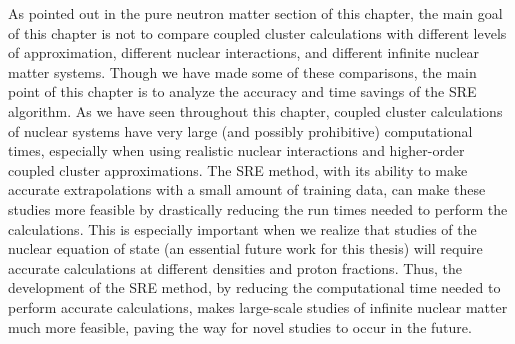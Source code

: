 As pointed out in the pure neutron matter section of this chapter, the main goal of this chapter is not to compare coupled cluster calculations with different levels of approximation, different nuclear interactions, and different infinite nuclear matter systems. Though we have made some of these comparisons, the main point of this chapter is to analyze the accuracy and time savings of the SRE algorithm. As we have seen throughout this chapter, coupled cluster calculations of nuclear systems have very large (and possibly prohibitive) computational times, especially when using realistic nuclear interactions and higher-order coupled cluster approximations. The SRE method, with its ability to make accurate extrapolations with a small amount of training data, can make these studies more feasible by drastically reducing the run times needed to perform the calculations. This is especially important when we realize that studies of the nuclear equation of state (an essential future work for this thesis) will require accurate calculations at different densities and proton fractions. Thus, the development of the SRE method, by reducing the computational time needed to perform accurate calculations, makes large-scale studies of infinite nuclear matter much more feasible, paving the way for novel studies to occur in the future.